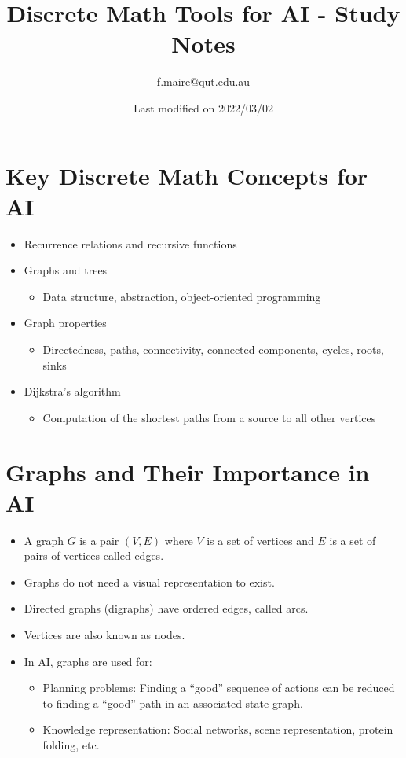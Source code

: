 \documentclass{article}
\title{Discrete Math Tools for AI - Study Notes}
\author{f.maire@qut.edu.au}
\date{Last modified on 2022/03/02}
\begin{document}
\maketitle

\section*{Key Discrete Math Concepts for AI}
\begin{itemize}
    \item Recurrence relations and recursive functions
    \item Graphs and trees
    \begin{itemize}
        \item Data structure, abstraction, object-oriented programming
    \end{itemize}
    \item Graph properties
    \begin{itemize}
        \item Directedness, paths, connectivity, connected components, cycles, roots, sinks
    \end{itemize}
    \item Dijkstra's algorithm
    \begin{itemize}
        \item Computation of the shortest paths from a source to all other vertices
    \end{itemize}
\end{itemize}

\section*{Graphs and Their Importance in AI}
\begin{itemize}
    \item A graph \( G \) is a pair \( (V, E) \) where \( V \) is a set of vertices and \( E \) is a set of pairs of vertices called edges.
    \item Graphs do not need a visual representation to exist.
    \item Directed graphs (digraphs) have ordered edges, called arcs.
    \item Vertices are also known as nodes.
    \item In AI, graphs are used for:
    \begin{itemize}
        \item Planning problems: Finding a “good” sequence of actions can be reduced to finding a “good” path in an associated state graph.
        \item Knowledge representation: Social networks, scene representation, protein folding, etc.
    \end{itemize}
\end{itemize}
\end{document}
